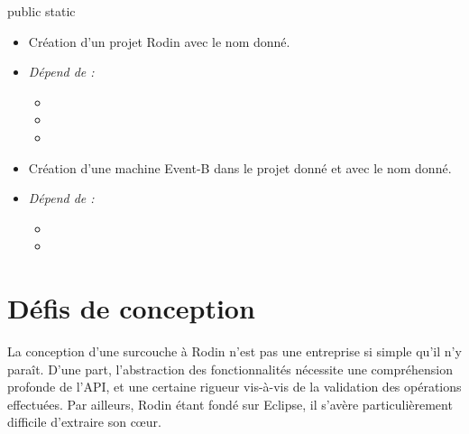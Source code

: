 \vspace{\baselineskip}
\begin{labeling}{public static}
    \setlength{\itemsep}{1.5em}

    \item [\javacode{public static}] 
        \begin{itemize}[label={}]
            \item Création d'un projet Rodin avec le nom donné.
            \item \textit{Dépend de :}
                \begin{itemize}
                    \item {}
                    \item {}
                    \item {}
                \end{itemize}
        \end{itemize}

    \item [\javacode{public static}] 
        \begin{itemize}[label={}]
            \item Création d'une machine Event-B dans le projet donné et avec le nom donné.
            \item \textit{Dépend de :}
                \begin{itemize}
                    \item {}
                    \item {}
                \end{itemize}
        \end{itemize}

\end{labeling}


\section{Défis de conception}

La conception d'une surcouche à Rodin n'est pas une entreprise si simple qu'il n'y paraît.
D'une part, l'abstraction des fonctionnalités nécessite une compréhension profonde de l'API, et une certaine rigueur vis-à-vis de la validation %
des opérations effectuées.
Par ailleurs, Rodin étant fondé sur Eclipse, il s'avère particulièrement difficile d'extraire son cœur.


